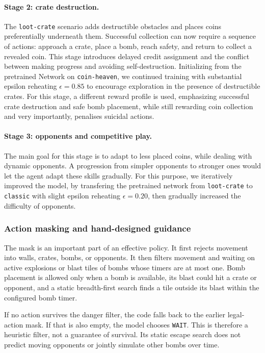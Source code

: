 \documentclass[11pt,a4paper]{article}
\begin{document}
\paragraph{Stage 2: crate destruction.}
The \texttt{loot-crate} scenario adds destructible obstacles and places coins
preferentially underneath them. Successful collection can now require a
sequence of actions: approach a crate, place a bomb, reach safety, and return
to collect a revealed coin. This stage introduces delayed credit assignment
and the conflict between making progress and avoiding self-destruction.
Initializing from the pretrained Network on \texttt{coin-heaven}, we continued training with substantial epsilon reheating $\epsilon = 0.85$ to encourage exploration in the presence of destructible crates. 
For this stage, a different reward profile is used, emphasizing successful crate destruction and safe bomb placement, while still rewarding coin collection and very importantly, penalises suicidal actions.

\paragraph{Stage 3: opponents and competitive play.}
The main goal for this stage is to adapt to less placed coins, while dealing with dynamic opponents.
A progression from simpler opponents to stronger ones would let the agent adapt these skills gradually. 
For this purpose, we iteratively improved the model, by transfering the pretrained network from \texttt{loot-crate} to \texttt{classic} with slight epsilon reheating $\epsilon = 0.20$, then gradually increased the difficulty of opponents.


\subsubsection{Action masking and hand-designed guidance}
The mask is an important part of an effective policy. It first rejects
movement into walls, crates, bombs, or opponents. It then filters movement
and waiting on active explosions or blast tiles of bombs whose timers are
at most one. Bomb placement is allowed only when a bomb is available, its
blast could hit a crate or opponent, and a static breadth-first search finds
a tile outside its blast within the configured bomb timer.

If no action survives the danger filter, the code falls back to the earlier
legal-action mask. If that is also empty, the model chooses \texttt{WAIT}.
This is therefore a heuristic filter, not a guarantee of survival. 
Its static escape search does not predict moving opponents or jointly simulate other bombs over time.
\end{document}
